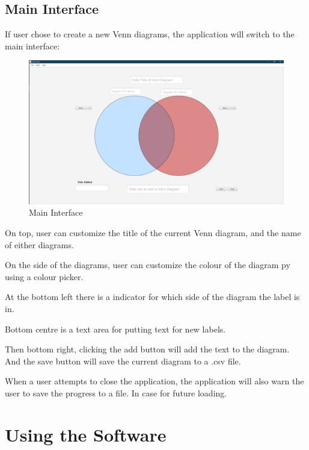 \documentclass[fontsize=12pt,paper=letter,twoside]{scrartcl}
\begin{document}
\subsection{Main Interface}

If user chose to create a new Venn diagrams, the application will switch to the main interface:

\begin{figure}[hbt]
	\begin{mdframed}
		\includegraphics[width=\textwidth]{images/main-screenshot.png}
	\end{mdframed}
	\caption{Main Interface}
\end{figure}

On top, user can customize the title of the current Venn diagram, and the
name of either diagrams.

On the side of the diagrams, user can customize the colour of the diagram
py using a colour picker.

At the bottom left there is a indicator for which side of the diagram the label
is in.

Bottom centre is a text area for putting text for new labels.

Then bottom right, clicking the add button will add the text to the diagram.
And the save button will save the current diagram to a .csv file.

When a user attempts to close the application, the application will also
warn the user to save the progress to a file. In case for future loading.


\newpage 
\section{Using the Software}
\end{document}
